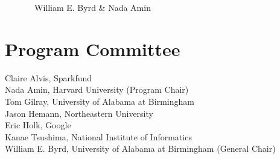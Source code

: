 \documentclass[a4paper]{book}
\begin{document}
\ \ \ \ \ \ \ William E. Byrd \& Nada Amin

\section*{Program Committee}
\noindent
Claire Alvis, Sparkfund\\
Nada Amin, Harvard University (Program Chair)\\
Tom Gilray, University of Alabama at Birmingham\\
Jason Hemann, Northeastern University\\
Eric Holk, Google\\
Kanae Tsushima, National Institute of Informatics\\
William E. Byrd, University of Alabama at Birmingham (General Chair)\\

\tableofcontents
\mainmatter
{}



\ \\
\pagebreak



\ \\
\pagebreak



\ \\
\pagebreak



\ \\
\pagebreak



\ \\
\pagebreak



\ \\
\pagebreak
\end{document}
